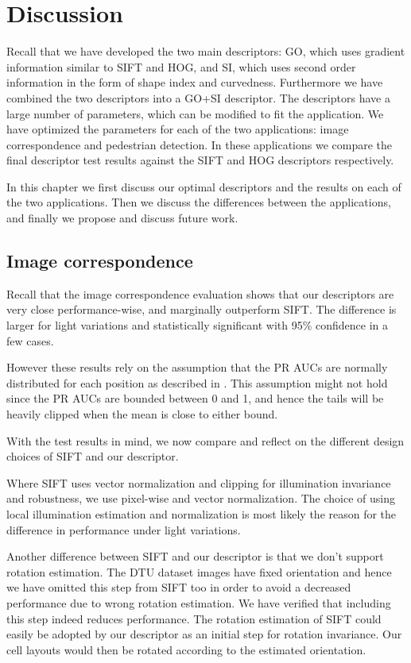 \documentclass[thesis.tex]{subfiles}
\begin{document}
\chapter{Discussion}

Recall that we have developed the two main descriptors: GO, which uses gradient information similar to SIFT and HOG, and SI, which uses second order information in the form of shape index and curvedness. Furthermore we have combined the two descriptors into a GO+SI descriptor. The descriptors have a large number of parameters, which can be modified to fit the application. We have optimized the parameters for each of the two applications: image correspondence and pedestrian detection. In these applications we compare the final descriptor test results against the SIFT and HOG descriptors respectively.

In this chapter we first discuss our optimal descriptors and the results on each of the two applications. Then we discuss the differences between the applications, and finally we propose and discuss future work.

\section{Image correspondence}
\label{sec:discussionIc}
Recall that the image correspondence evaluation shows that our descriptors are very close performance-wise, and marginally outperform SIFT. The difference is larger for light variations and statistically significant with 95\% confidence in a few cases.

However these results rely on the assumption that the PR AUCs are normally distributed for each position as described in . This assumption might not hold since the PR AUCs are bounded between 0 and 1, and hence the tails will be heavily clipped when the mean is close to either bound.

With the test results in mind, we now compare and reflect on the different design choices of SIFT and our descriptor.

Where SIFT uses vector normalization and clipping for illumination invariance and robustness, we use pixel-wise and vector normalization. The choice of using local illumination estimation and normalization is most likely the reason for the difference in performance under light variations.

Another difference between SIFT and our descriptor is that we don't support rotation estimation. The DTU dataset images have fixed orientation and hence we have omitted this step from SIFT too in order to avoid a decreased performance due to wrong rotation estimation. We have verified that including this step indeed reduces performance. The rotation estimation of SIFT could easily be adopted by our descriptor as an initial step for rotation invariance. Our cell layouts would then be rotated according to the estimated orientation.
\end{document}

